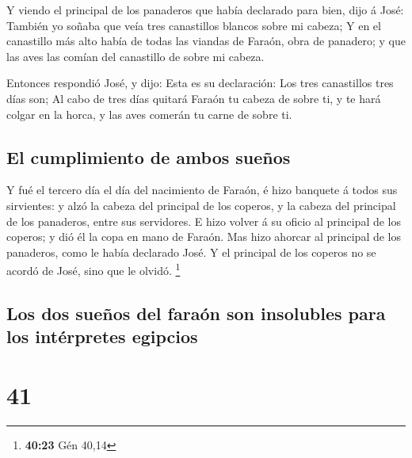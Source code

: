  Y viendo el principal de los panaderos que había declarado
para bien, dijo á José: También yo soñaba que veía tres canastillos
blancos sobre mi cabeza;  Y en el canastillo más alto había
de todas las viandas de Faraón, obra de panadero; y que las aves las
comían del canastillo de sobre mi cabeza.

 Entonces respondió José, y dijo: Esta es su declaración:
Los tres canastillos tres días son;  Al cabo de tres días
quitará Faraón tu cabeza de sobre ti, y te hará colgar en la horca, y
las aves comerán tu carne de sobre ti.

\hypertarget{el-cumplimiento-de-ambos-sueuxf1os}{%
\subsection{El cumplimiento de ambos
sueños}\label{el-cumplimiento-de-ambos-sueuxf1os}}

 Y fué el tercero día el día del nacimiento de Faraón, é
hizo banquete á todos sus sirvientes: y alzó la cabeza del principal de
los coperos, y la cabeza del principal de los panaderos, entre sus
servidores.  E hizo volver á su oficio al principal de los
coperos; y dió él la copa en mano de Faraón.  Mas hizo
ahorcar al principal de los panaderos, como le había declarado José.
 Y el principal de los coperos no se acordó de José, sino
que le olvidó. \footnote{\textbf{40:23} Gén 40,14}

\hypertarget{los-dos-sueuxf1os-del-farauxf3n-son-insolubles-para-los-intuxe9rpretes-egipcios}{%
\subsection{Los dos sueños del faraón son insolubles para los
intérpretes
egipcios}\label{los-dos-sueuxf1os-del-farauxf3n-son-insolubles-para-los-intuxe9rpretes-egipcios}}

\hypertarget{section-40}{%
\section{41}\label{section-40}}

